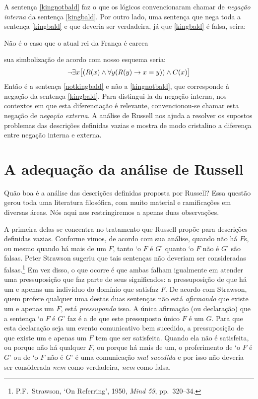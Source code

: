A sentença \ref{kingnotbald} faz o que os lógicos convencionaram chamar de  \emph{negação interna} da sentença \ref{kingbald}.
Por outro lado, uma sentença que nega toda a sentença \ref{kingbald} e que deveria ser verdadeira, já que \ref{kingbald} é falsa, seira:
	\begin{earg}
		\item[\ex{notkingbald}] Não é o caso que o atual rei da França é careca
	\end{earg}
sua simbolização de acordo com nosso esquema seria:
$$\neg\exists x \bigl[(\mathord{R}(x) \wedge \forall y (\mathord{R}(y) \rightarrow x = y)) \wedge \mathord{C}(x)\bigr]$$
Então é a sentença \ref{notkingbald} e não a \ref{kingnotbald}, que corresponde à negação da sentença \ref{kingbald}.
Para distingui-la da negação interna, nos contextos em que esta diferenciação é relevante, convencionou-se chamar esta negação de \emph{negação externa}.
A análise de Russell nos ajuda a resolver os supostos problemas das descrições definidas vazias e mostra de modo cristalino a diferença entre negação interna e externa.


\section{A adequação da análise de Russell}
Quão boa é a análise das descrições definidas proposta por Russell?
Essa questão gerou toda uma literatura filosófica, com muito material e ramificações em diversas áreas.
Nós aqui nos restringiremos a apenas duas observações.

A primeira delas se concentra no tratamento que Russell propõe para descrições definidas vazias.
Conforme vimos, de acordo com sua análise, quando não há $F$s, ou mesmo quando há mais de um $F$, tanto `o $F$ é $G$' quanto `o $F$ não é $G$' são falsas.
Peter Strawson sugeriu que tais sentenças não deveriam ser consideradas falsas.\footnote{
	P.F.\ Strawson, `On Referring', 1950, \emph{Mind 59}, pp.\ 320--34.}
Em vez disso, o que ocorre é que ambas falham igualmente em atender uma pressuposição que faz parte de seus significados: a pressuposição de que há um e apenas um indivíduo do domínio que satisfaz $F$.
De acordo com Strawson, quem profere qualquer uma destas duas sentenças não está \emph{afirmando} que existe um e apenas um $F$, está \emph{pressupondo} isso. A única afirmação (ou declaração) que a sentença `o $F$ é $G$' faz é a de que este pressuposto único $F$ é um $G$.
Para que esta declaração seja um evento comunicativo bem sucedido, a pressuposição de que existe um e apenas um $F$ tem que ser satisfeita.
Quando ela não é satisfeita, ou porque não há qualquer $F$, ou porque há mais de um, o proferimento de `o $F$ é $G$' ou de `o $F$ não é $G$' é uma comunicação \emph{mal sucedida} e por isso não deveria ser considerada \emph{nem} como verdadeira, \emph{nem} como falsa.

